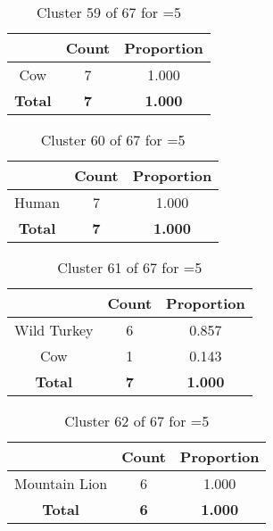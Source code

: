 \begin{table}[ht!]
\centering
\begin{tabular}{|c|c|c|}
\hline
\bf \Spec{} &\bf Count &\bf Proportion\\ \hline \hline
Cow & 7 & 1.000\\ \hline
\hline
\bf Total & \bf 7 & \bf 1.000\\ \hline
\end{tabular}
\label{tab:cluster:59:5}
\caption{Cluster 59 of 67 for \minneigh{}=5}
\end{table}

\clearpage
\begin{table}[ht!]
\centering
\begin{tabular}{|c|c|c|}
\hline
\bf \Spec{} &\bf Count &\bf Proportion\\ \hline \hline
Human & 7 & 1.000\\ \hline
\hline
\bf Total & \bf 7 & \bf 1.000\\ \hline
\end{tabular}
\label{tab:cluster:60:5}
\caption{Cluster 60 of 67 for \minneigh{}=5}
\end{table}

\begin{table}[ht!]
\centering
\begin{tabular}{|c|c|c|}
\hline
\bf \Spec{} &\bf Count &\bf Proportion\\ \hline \hline
Wild Turkey & 6 & 0.857\\ \hline
Cow & 1 & 0.143\\ \hline
\hline
\bf Total & \bf 7 & \bf 1.000\\ \hline
\end{tabular}
\label{tab:cluster:61:5}
\caption{Cluster 61 of 67 for \minneigh{}=5}
\end{table}

\begin{table}[ht!]
\centering
\begin{tabular}{|c|c|c|}
\hline
\bf \Spec{} &\bf Count &\bf Proportion\\ \hline \hline
Mountain Lion & 6 & 1.000\\ \hline
\hline
\bf Total & \bf 6 & \bf 1.000\\ \hline
\end{tabular}
\label{tab:cluster:62:5}
\caption{Cluster 62 of 67 for \minneigh{}=5}
\end{table}

